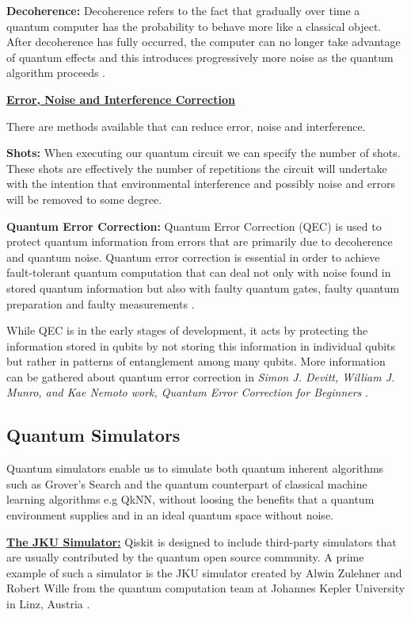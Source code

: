 \textbf{Decoherence:} Decoherence refers to the fact that gradually over time a quantum computer has the probability to behave more like a classical object. After decoherence has fully occurred, the computer can no longer take advantage of quantum effects and this introduces progressively more noise as the quantum algorithm proceeds \citep{ColesQuantumAIC20}.

\vspace{0.4cm}
\textbf{\underline{Error, Noise and Interference Correction}}

There are methods available that can reduce error, noise and interference.

\textbf{Shots:} When executing our quantum circuit we can specify the number of shots. These shots are effectively the number of repetitions the circuit will undertake with the intention that environmental interference and possibly noise and errors will be removed to some degree. 

\textbf{Quantum Error Correction:}\label{QEC} Quantum Error Correction (QEC) is used to protect quantum information from errors that are primarily due to decoherence and quantum noise. Quantum error correction is essential in order to achieve fault-tolerant quantum computation that can deal not only with noise found in stored quantum information but also with faulty quantum gates, faulty quantum preparation and faulty measurements \citep{wikiERI}.

While QEC is in the early stages of development, it acts by protecting the information stored in qubits by not storing this information in individual qubits but rather in patterns of entanglement among many qubits. More information can be gathered about quantum error correction in \emph{Simon J. Devitt, William J. Munro, and Kae Nemoto work, Quantum Error Correction for Beginners} \citep{Devitt_2013}.

\subsection{Quantum Simulators}
Quantum simulators enable us to simulate both quantum inherent algorithms such as Grover's Search and the quantum counterpart of classical machine learning algorithms e.g QkNN, without loosing the benefits that a quantum environment supplies and in an ideal quantum space without noise.

\vspace{0.4cm}
\textbf{\underline{The JKU Simulator:}}
Qiskit is designed to include third-party simulators that are usually contributed by the quantum open source community. A prime example of such a simulator is the JKU simulator created by Alwin Zulehner and Robert Wille from the quantum computation team at Johannes Kepler University in Linz,
Austria \citep{navehC21}.


